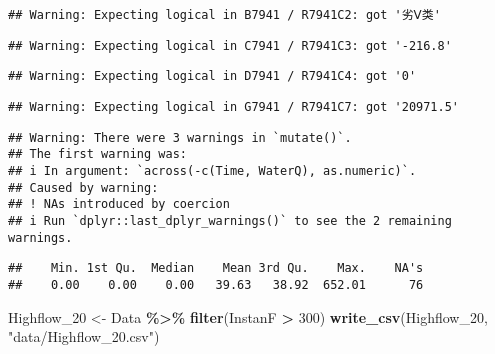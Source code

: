 \documentclass[
]{article}
\newenvironment{Shaded}{\begin{snugshade}}{\end{snugshade}}
\newcommand{\DecValTok}[1]{\textcolor[rgb]{0.00,0.00,0.81}{#1}}
\newcommand{\FunctionTok}[1]{\textcolor[rgb]{0.13,0.29,0.53}{\textbf{#1}}}
\newcommand{\NormalTok}[1]{#1}
\newcommand{\OtherTok}[1]{\textcolor[rgb]{0.56,0.35,0.01}{#1}}
\newcommand{\SpecialCharTok}[1]{\textcolor[rgb]{0.81,0.36,0.00}{\textbf{#1}}}
\newcommand{\StringTok}[1]{\textcolor[rgb]{0.31,0.60,0.02}{#1}}
\begin{document}
\begin{verbatim}
## Warning: Expecting logical in B7941 / R7941C2: got '劣Ⅴ类'
\end{verbatim}

\begin{verbatim}
## Warning: Expecting logical in C7941 / R7941C3: got '-216.8'
\end{verbatim}

\begin{verbatim}
## Warning: Expecting logical in D7941 / R7941C4: got '0'
\end{verbatim}

\begin{verbatim}
## Warning: Expecting logical in G7941 / R7941C7: got '20971.5'
\end{verbatim}

\begin{Shaded}
\end{Shaded}

\begin{verbatim}
## Warning: There were 3 warnings in `mutate()`.
## The first warning was:
## i In argument: `across(-c(Time, WaterQ), as.numeric)`.
## Caused by warning:
## ! NAs introduced by coercion
## i Run `dplyr::last_dplyr_warnings()` to see the 2 remaining warnings.
\end{verbatim}

\begin{Shaded}
\end{Shaded}

\begin{verbatim}
##    Min. 1st Qu.  Median    Mean 3rd Qu.    Max.    NA's 
##    0.00    0.00    0.00   39.63   38.92  652.01      76
\end{verbatim}

\begin{Shaded}
\begin{Highlighting}[]
\NormalTok{Highflow\_20 }\OtherTok{\textless{}{-}}\NormalTok{ Data }\SpecialCharTok{\%\textgreater{}\%} \FunctionTok{filter}\NormalTok{(InstanF }\SpecialCharTok{\textgreater{}} \DecValTok{300}\NormalTok{)}
\FunctionTok{write\_csv}\NormalTok{(Highflow\_20, }\StringTok{"data/Highflow\_20.csv"}\NormalTok{)}
\end{Highlighting}
\end{Shaded}
\end{document}
